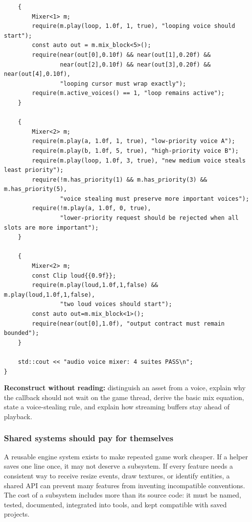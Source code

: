\begin{verbatim}
    {
        Mixer<1> m;
        require(m.play(loop, 1.0f, 1, true), "looping voice should start");
        const auto out = m.mix_block<5>();
        require(near(out[0],0.10f) && near(out[1],0.20f) &&
                near(out[2],0.10f) && near(out[3],0.20f) && near(out[4],0.10f),
                "looping cursor must wrap exactly");
        require(m.active_voices() == 1, "loop remains active");
    }

    {
        Mixer<2> m;
        require(m.play(a, 1.0f, 1, true), "low-priority voice A");
        require(m.play(b, 1.0f, 5, true), "high-priority voice B");
        require(m.play(loop, 1.0f, 3, true), "new medium voice steals least priority");
        require(!m.has_priority(1) && m.has_priority(3) && m.has_priority(5),
                "voice stealing must preserve more important voices");
        require(!m.play(a, 1.0f, 0, true),
                "lower-priority request should be rejected when all slots are more important");
    }

    {
        Mixer<2> m;
        const Clip loud{{0.9f}};
        require(m.play(loud,1.0f,1,false) && m.play(loud,1.0f,1,false),
                "two loud voices should start");
        const auto out=m.mix_block<1>();
        require(near(out[0],1.0f), "output contract must remain bounded");
    }

    std::cout << "audio voice mixer: 4 suites PASS\n";
}
\end{verbatim}

\textbf{Reconstruct without reading:} distinguish an asset from a voice, explain why the callback should not wait on the game thread, derive the basic mix equation, state a voice-stealing rule, and explain how streaming buffers stay ahead of playback.

\subsubsection{Shared systems should pay for themselves}\label{05-engine-i-ch009-shared-systems-should-pay-for-themselves}

\hypertarget{05-engine-i-ch009-shared-systems-should-pay-for-themselves}{}

A reusable engine system exists to make repeated game work cheaper. If a helper saves one line once, it may not deserve a subsystem. If every feature needs a consistent way to receive resize events, draw textures, or identify entities, a shared API can prevent many features from inventing incompatible conventions. The cost of a subsystem includes more than its source code: it must be named, tested, documented, integrated into tools, and kept compatible with saved projects.

